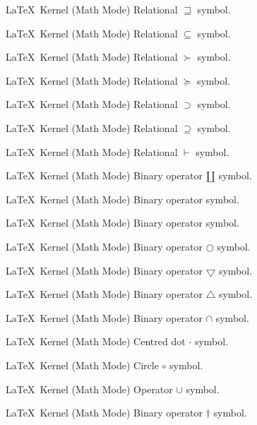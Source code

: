 %
 {}%
 {\LaTeX\ Kernel (Math Mode)}%
 {Relational \ensuremath{\sqsupseteq} symbol.}%
 {}

%
 {}%
 {\LaTeX\ Kernel (Math Mode)}%
 {Relational \ensuremath{\subseteq} symbol.}%
 {}

%
 {}%
 {\LaTeX\ Kernel (Math Mode)}%
 {Relational \ensuremath{\succ} symbol.}%
 {}

%
 {}%
 {\LaTeX\ Kernel (Math Mode)}%
 {Relational \ensuremath{\succeq} symbol.}%
 {}

%
 {}%
 {\LaTeX\ Kernel (Math Mode)}%
 {Relational \ensuremath{\supset} symbol.}%
 {}

%
 {}%
 {\LaTeX\ Kernel (Math Mode)}%
 {Relational \ensuremath{\supseteq} symbol.}%
 {}

%
 {}%
 {\LaTeX\ Kernel (Math Mode)}%
 {Relational \ensuremath{\vdash} symbol.}%
 {}

%
 {}%
 {\LaTeX\ Kernel (Math Mode)}%
 {Binary operator \ensuremath{\amalg} symbol.}%
 {}

%
 {}%
 {\LaTeX\ Kernel (Math Mode)}%
 {Binary operator  symbol.}%
 {}

%
 {}%
 {\LaTeX\ Kernel (Math Mode)}%
 {Binary operator  symbol.}%
 {}

%
 {}%
 {\LaTeX\ Kernel (Math Mode)}%
 {Binary operator \ensuremath{\bigcirc} symbol.}%
 {}

%
 {}%
 {\LaTeX\ Kernel (Math Mode)}%
 {Binary operator \ensuremath{\bigtriangledown} symbol.}%
 {}

%
 {}%
 {\LaTeX\ Kernel (Math Mode)}%
 {Binary operator \ensuremath{\bigtriangleup} symbol.}%
 {}

%
 {}%
 {\LaTeX\ Kernel (Math Mode)}%
 {Binary operator \ensuremath{\cap} symbol.}%
 {}

%
 {}%
 {\LaTeX\ Kernel (Math Mode)}%
 {Centred dot \ensuremath{\cdot} symbol.}%
 {}

%
 {}%
 {\LaTeX\ Kernel (Math Mode)}%
 {Circle \ensuremath{\circ} symbol.}%
 {}

%
 {}%
 {\LaTeX\ Kernel (Math Mode)}%
 {Operator \ensuremath{\cup} symbol.}%
 {}

%
 {}%
 {\LaTeX\ Kernel (Math Mode)}%
 {Binary operator \ensuremath{\dagger} symbol.}%
 {}

